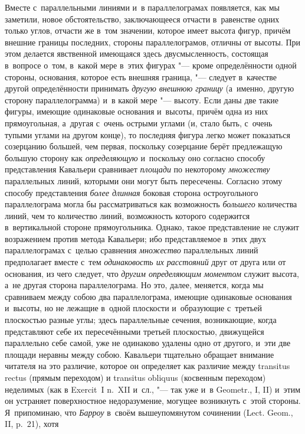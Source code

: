 Вместе с~параллельными линиями и~в параллелограмах появляется, как мы заметили,
новое обстоятельство, заключающееся отчасти в~равенстве одних только углов,
отчасти же в~том значении, которое имеет высота фигур, причём внешние границы
последних, стороны параллелограмов, отличны от высоты. При этом делается
явственной имеющаяся здесь двусмысленность, состоящая в~вопросе о~том, в~какой
мере в~этих фигурах "--- кроме определённости одной стороны, основания, которое
есть внешняя граница, "--- следует в~качестве другой определённости принимать
{\em другую внешнюю границу} (а~именно, другую сторону параллелограмма) и~в
какой мере "--- высоту. Если даны две такие фигуры, имеющие одинаковые
основания и~высоты, причём одна из них прямоугольная, а~другая с~очень острыми
углами (и, стало быть, с~очень тупыми углами на другом конце), то последняя
фигура легко может показаться созерцанию большей, чем первая, поскольку
созерцание берёт предлежащую большую сторону как {\em определяющую} и~поскольку
оно согласно способу представления Кавальери сравнивает {\em площади} по
некоторому {\em множеству} параллельных линий, которыми они могут быть
пересечены. Согласно этому способу представления {\em более длинная} боковая
сторона остроугольного параллелограма могла бы рассматриваться как возможность
{\em большего} количества линий, чем то количество линий, возможность
которого содержится в~вертикальной стороне прямоугольника. Однако, такое
представление не служит возражением против метода Кавальери; ибо представляемое
в~этих двух параллелограмах с~целью сравнения {\em множество} параллельных
линий предполагает вместе с~тем {\em одинаковость их расстояний} друг от друга
или от основания, из чего следует, что {\em другим определяющим моментом}
служит высота, а~не другая сторона параллелограма. Но это, далее, меняется,
когда мы сравниваем между собою два параллелограма, имеющие одинаковые
основания и~высоты, но не лежащие в~одной плоскости и~образующие с~третьей
плоскостью разные углы; здесь параллельные сечения, возникающие, когда
представляют себе их пересечёнными третьей плоскостью, движущейся параллельно
себе самой, уже не одинаково удалены одно от другого, и~эти две площади неравны
между собою. Кавальери тщательно обращает внимание читателя на это различие,
которое он определяет как различие между transitus rectus (прямым переходом) и
transitus obliquus (косвенным переходом) неделимых (как в Exercit~I n.~XII
и~сл., "--- так уже и~в Geometr., I, II) и~этим он устраняет поверхностное
недоразумение, могущее возникнуть с~этой стороны. Я~припоминаю, что
{\em Барроу} в~своём вышеупомянутом сочинении (Lect. Geom., II, p.~21), хотя
